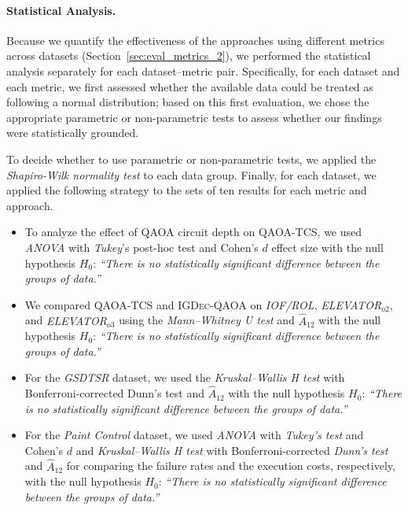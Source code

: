 \paragraph{Statistical Analysis.}
Because we quantify the effectiveness of the approaches using different metrics across datasets (Section~\ref{sec:eval_metrics_2}), we performed the statistical analysis separately for each dataset--metric pair.
Specifically, for each dataset and each metric, we first assessed whether the available data could be treated as following a normal distribution; based on this first evaluation, we chose the appropriate parametric or non-parametric tests to assess whether our findings were statistically grounded.

To decide whether to use parametric or non-parametric tests, we applied the \textit{Shapiro-Wilk normality test} to each data group.
Finally, for each dataset, we applied the following strategy to the sets of ten results for each metric and approach.

\begin{itemize}
    \item To analyze the effect of QAOA circuit depth on \textsc{QAOA-TCS}, we used \textit{ANOVA} with \textit{Tukey}’s post-hoc test and Cohen's $d$ effect size with the null hypothesis $H_0$: \textit{``There is no statistically significant difference between the groups of data.''}
    \item We compared \textsc{QAOA-TCS} and \textsc{IGDec-QAOA} on \textit{IOF/ROL}, \textit{ELEVATOR$_{o2}$}, and \textit{ELEVATOR$_{o3}$} using the \textit{Mann–Whitney U test} and $\hat{A}_{12}$ with the null hypothesis $H_0$: \textit{``There is no statistically significant difference between the groups of data.''}
    \item For the \textit{GSDTSR} dataset, we used the \textit{Kruskal–Wallis H test} with Bonferroni-corrected Dunn’s test and $\hat{A}_{12}$ with the null hypothesis $H_0$: \textit{``There is no statistically significant difference between the groups of data.''}
    \item For the \textit{Paint Control} dataset, we used \textit{ANOVA} with \textit{Tukey's test} and Cohen's $d$ and \textit{Kruskal–Wallis H test} with Bonferroni-corrected \textit{Dunn's test} and $\hat{A}_{12}$ for comparing the failure rates and the execution costs, respectively, with the null hypothesis $H_0$: \textit{``There is no statistically significant difference between the groups of data.''}
\end{itemize}

